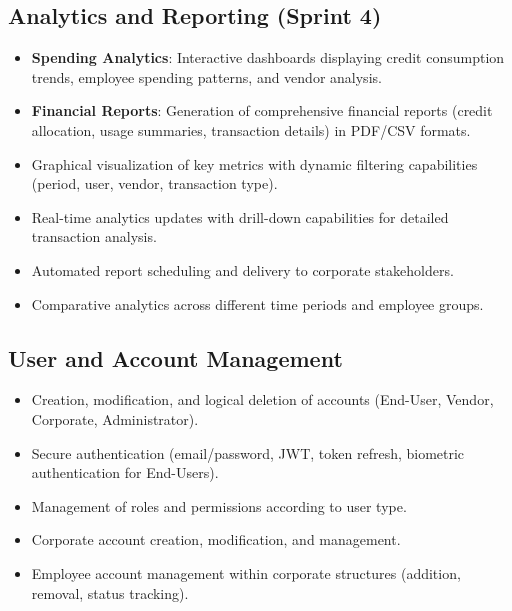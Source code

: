 \subsection{Analytics and Reporting (Sprint 4)}
\begin{itemize}
    \item \textbf{Spending Analytics}: Interactive dashboards displaying credit consumption trends, employee spending patterns, and vendor analysis.
    \item \textbf{Financial Reports}: Generation of comprehensive financial reports (credit allocation, usage summaries, transaction details) in PDF/CSV formats.
    \item Graphical visualization of key metrics with dynamic filtering capabilities (period, user, vendor, transaction type).
    \item Real-time analytics updates with drill-down capabilities for detailed transaction analysis.
    \item Automated report scheduling and delivery to corporate stakeholders.
    \item Comparative analytics across different time periods and employee groups.
\end{itemize}

\subsection{User and Account Management}
\begin{itemize}
    \item Creation, modification, and logical deletion of accounts (End-User, Vendor, Corporate, Administrator).
    \item Secure authentication (email/password, JWT, token refresh, biometric authentication for End-Users).
    \item Management of roles and permissions according to user type.
    \item Corporate account creation, modification, and management.
    \item Employee account management within corporate structures (addition, removal, status tracking).
\end{itemize}

